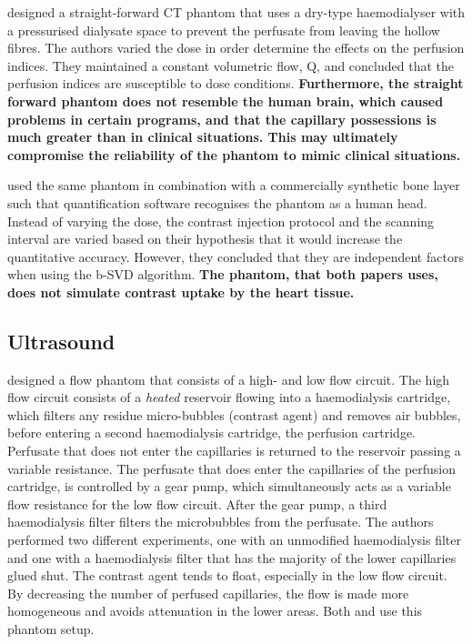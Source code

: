 \cite{suzuki2017quantitative} designed a straight-forward \ac{CT} phantom that uses a dry-type haemodialyser with a pressurised dialysate space to prevent the perfusate from leaving the hollow fibres. The authors varied the dose in order determine the effects on the perfusion indices. They maintained a constant volumetric flow, Q, and concluded that the perfusion indices are susceptible to dose conditions. \textbf{Furthermore, the straight forward phantom does not resemble the human brain, which caused problems in certain programs, and that the capillary possessions is much greater than in clinical situations. This may ultimately compromise the reliability of the phantom to mimic clinical situations.}

\cite{hashimoto2018effect} used the same phantom in combination with a commercially synthetic bone layer such that quantification software recognises the phantom as a human head. Instead of varying the dose, the contrast injection protocol and the scanning interval are varied based on their hypothesis that it would increase the quantitative accuracy. However, they concluded that they are independent factors when using the b-SVD algorithm. \textbf{The phantom, that both papers uses, does not simulate contrast uptake by the heart tissue.}

\subsection{Ultrasound}

\cite{veltmann2002design} designed a flow phantom that consists of a high- and low flow circuit. The high flow circuit consists of a \textit{heated} reservoir flowing into a haemodialysis cartridge, which filters any residue micro-bubbles (contrast agent) and removes air bubbles, before entering a second haemodialysis cartridge, the perfusion cartridge. Perfusate that does not enter the capillaries is returned to the reservoir passing a variable resistance. The perfusate that does enter the capillaries of the perfusion cartridge, is controlled by a gear pump, which simultaneously acts as a variable flow resistance for the low flow circuit. After the gear pump, a third haemodialysis filter filters the microbubbles from the perfusate. The authors performed two different experiments, one with an unmodified haemodialysis filter and one with a haemodialysis filter that has the majority of the lower capillaries glued shut. The contrast agent tends to float, especially in the low flow circuit. By decreasing the number of perfused capillaries, the flow is made more homogeneous and avoids attenuation in the lower areas. Both \cite{sakano2015power} and \cite{lohmaier2004vitro} use this phantom setup.


